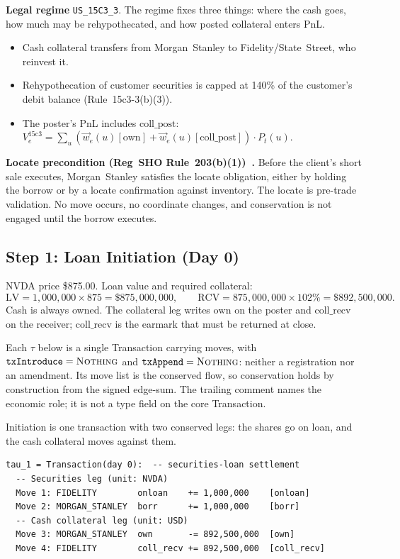 \medskip
\noindent\textbf{Legal regime} \texttt{US\_15C3\_3}. The regime fixes three things: where the cash goes, how much may be rehypothecated, and how posted collateral enters PnL.
\begin{itemize}[nosep]
\item Cash collateral transfers from Morgan~Stanley to Fidelity/State~Street, who reinvest it.
\item Rehypothecation of customer securities is capped at 140\% of the customer's debit balance (Rule~15c3-3(b)(3)).
\item The poster's PnL includes $\mathrm{coll\_post}$: $V_e^{\mathrm{15c3}} = \sum_u (\vec{w}_e(u)[\mathrm{own}] + \vec{w}_e(u)[\mathrm{coll\_post}]) \cdot P_t(u)$.
\end{itemize}

\medskip
\noindent\textbf{Locate precondition (Reg~SHO Rule~203(b)(1))~\cite{regsho}.} Before the client's short sale executes, Morgan~Stanley satisfies the locate obligation, either by holding the borrow or by a locate confirmation against inventory. The locate is pre-trade validation. No move occurs, no coordinate changes, and conservation is not engaged until the borrow executes.

\subsection{Step 1: Loan Initiation (Day 0)}
\label{sec:us-step1}

NVDA price \$875.00. Loan value and required collateral:
\[
\mathrm{LV} = 1{,}000{,}000 \times 875 = \$875{,}000{,}000, \qquad
\mathrm{RCV} = 875{,}000{,}000 \times 102\% = \$892{,}500{,}000.
\]
Cash is always owned. The collateral leg writes $\mathrm{own}$ on the poster and $\mathrm{coll\_recv}$ on the receiver; $\mathrm{coll\_recv}$ is the earmark that must be returned at close.

\noindent Each $\tau$ below is a single Transaction carrying moves, with $\mathtt{txIntroduce}=\textsc{Nothing}$ and $\mathtt{txAppend}=\textsc{Nothing}$: neither a registration nor an amendment. Its move list is the conserved flow, so conservation holds by construction from the signed edge-sum. The trailing comment names the economic role; it is not a type field on the core Transaction.

\medskip
\noindent Initiation is one transaction with two conserved legs: the shares go on loan, and the cash collateral moves against them.

\begin{lstlisting}
tau_1 = Transaction(day 0):  -- securities-loan settlement
  -- Securities leg (unit: NVDA)
  Move 1: FIDELITY        onloan    += 1,000,000    [onloan]
  Move 2: MORGAN_STANLEY  borr      += 1,000,000    [borr]
  -- Cash collateral leg (unit: USD)
  Move 3: MORGAN_STANLEY  own       -= 892,500,000  [own]
  Move 4: FIDELITY        coll_recv += 892,500,000  [coll_recv]
\end{lstlisting}

